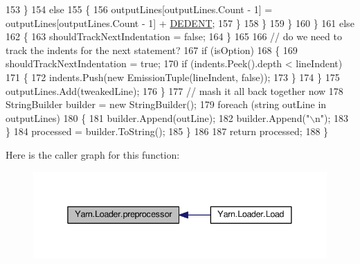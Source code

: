 \begin{DoxyCode}
153                                 \}
154                                 \textcolor{keywordflow}{else}
155                                 \{
156                                     outputLines[outputLines.Count - 1] = outputLines[outputLines.Count - 1]
       + \hyperlink{a00324_a83653c3e52fa74614e655a91ad2b7181}{DEDENT};
157                                 \}
158                             \}
159                         \}
160                     \}
161                     \textcolor{keywordflow}{else}
162                     \{
163                         shouldTrackNextIndentation = \textcolor{keyword}{false};
164                     \}
165 
166                     \textcolor{comment}{// do we need to track the indents for the next statement?}
167                     \textcolor{keywordflow}{if} (isOption)
168                     \{
169                         shouldTrackNextIndentation = \textcolor{keyword}{true};
170                         \textcolor{keywordflow}{if} (indents.Peek().depth < lineIndent)
171                         \{
172                             indents.Push(\textcolor{keyword}{new} EmissionTuple(lineIndent, \textcolor{keyword}{false}));
173                         \}
174                     \}
175                     outputLines.Add(tweakedLine);
176                 \}
177                 \textcolor{comment}{// mash it all back together now}
178                 StringBuilder builder = \textcolor{keyword}{new} StringBuilder();
179                 \textcolor{keywordflow}{foreach} (\textcolor{keywordtype}{string} outLine \textcolor{keywordflow}{in} outputLines)
180                 \{
181                     builder.Append(outLine);
182                     builder.Append(\textcolor{stringliteral}{"\(\backslash\)n"});
183                 \}
184                 processed = builder.ToString();
185             \}
186 
187             \textcolor{keywordflow}{return} processed;
188         \}
\end{DoxyCode}


Here is the caller graph for this function\-:
\nopagebreak
\begin{figure}[H]
\begin{center}
\leavevmode
\includegraphics[width=338pt]{a00127_a0b09a29edd2ed13d52203f1b71a47081_icgraph}
\end{center}
\end{figure}




